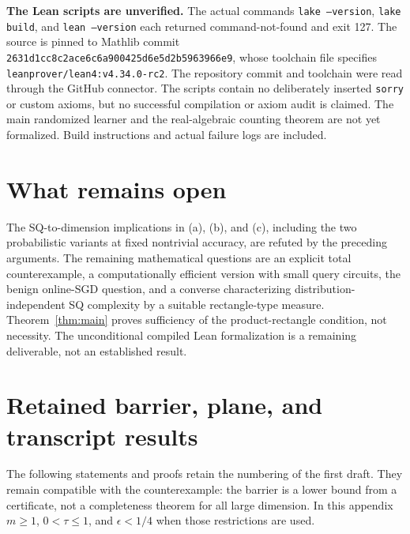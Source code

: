 \documentclass[11pt]{article}
\newcommand{\1}{\mathbf 1}
\begin{document}
\textbf{The Lean scripts are unverified.} The actual commands \texttt{lake --version}, \texttt{lake build}, and \texttt{lean --version} each returned command-not-found and exit 127. The source is pinned to Mathlib commit \texttt{2631d1cc8c2ace6c6a900425d6e5d2b5963966e9}, whose toolchain file specifies \texttt{leanprover/lean4:v4.34.0-rc2}. The repository commit and toolchain were read through the GitHub connector. The scripts contain no deliberately inserted \texttt{sorry} or custom axioms, but no successful compilation or axiom audit is claimed. The main randomized learner and the real-algebraic counting theorem are not yet formalized. Build instructions and actual failure logs are included.

\section{What remains open}
The SQ-to-dimension implications in (a), (b), and (c), including the two probabilistic variants at fixed nontrivial accuracy, are refuted by the preceding arguments. The remaining mathematical questions are an explicit total counterexample, a computationally efficient version with small query circuits, the benign online-SGD question, and a converse characterizing distribution-independent SQ complexity by a suitable rectangle-type measure. Theorem~\ref{thm:main} proves sufficiency of the product-rectangle condition, not necessity. The unconditional compiled Lean formalization is a remaining deliverable, not an established result.

\appendix
\section{Retained barrier, plane, and transcript results}\label{sec:retained}
The following statements and proofs retain the numbering of the first draft. They remain compatible with the counterexample: the barrier is a lower bound from a certificate, not a completeness theorem for all large dimension. In this appendix $m\ge1$, $0<\tau\le1$, and $\epsilon<1/4$ when those restrictions are used.
\setcounter{theorem}{0}

\end{document}
